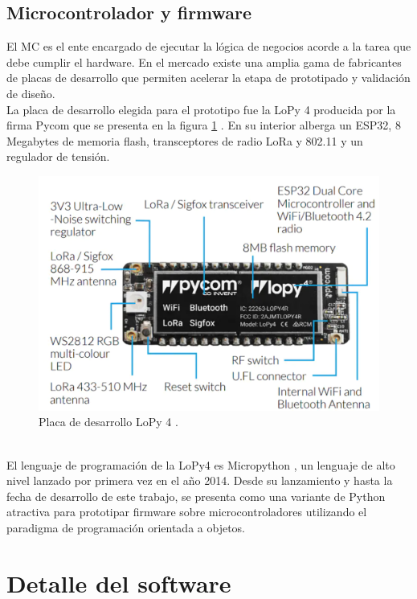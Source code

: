 \subsection{Microcontrolador y firmware}
El MC es el ente encargado de ejecutar la lógica de negocios acorde a la tarea que debe cumplir el hardware. En el mercado existe una amplia gama de fabricantes de placas de desarrollo que permiten acelerar la etapa de prototipado y validación de diseño.\\
La placa de desarrollo elegida para el prototipo fue la LoPy 4 producida por la firma Pycom que se presenta en la figura \ref{fig:lopy4} . En su interior alberga un ESP32, 8 Megabytes de memoria flash, transceptores de radio LoRa y 802.11 y un regulador de tensión.\\
\begin{figure}[h]
	\centering
	\includegraphics[width=0.95\linewidth]{Figures/lopy4}
	\caption{Placa de desarrollo LoPy 4 \citep{lopy4}.}
	\label{fig:lopy4}
\end{figure}\\
El lenguaje de programación de la LoPy4 es Micropython \citep{micropy}, un lenguaje de alto nivel lanzado por primera vez en el año 2014. Desde su lanzamiento y hasta la fecha de desarrollo de este trabajo, se presenta como una variante de Python atractiva para prototipar firmware sobre microcontroladores utilizando el paradigma de programación orientada a objetos.\\


\section{Detalle del software}
